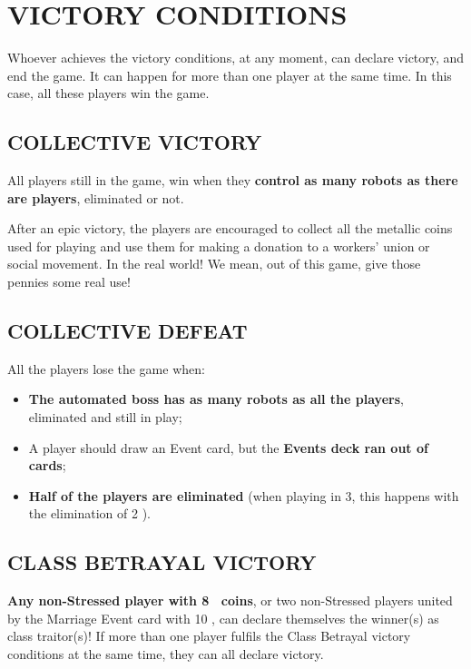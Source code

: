 \section{VICTORY CONDITIONS}

    Whoever achieves the victory conditions, at any moment, can declare victory,
    and end the game. It can happen for more than one player at the same time. In
    this case, all these players win the game.

    \subsection{COLLECTIVE VICTORY}
    
        All players still in the game, win when they \textbf{control as many robots as there are
        players}, eliminated or not.

        After an epic victory, the players are encouraged to collect all the metallic coins
        used for playing and use them for making a donation to a workers' union or social
        movement. In the real world! We mean, out of this game, give those pennies
        some real use!
    
    \subsection{COLLECTIVE DEFEAT}
    
        All the players lose the game when:
        \begin{itemize}
            \item \textbf{The automated boss has as many robots as all the players}, eliminated
            and still in play;
            \item A player should draw an Event card, but the \textbf{Events deck ran out of cards};
            \item \textbf{Half of the players are eliminated} (when playing in 3, this happens with the
            elimination of 2 \faPeopleGroup).
        \end{itemize}
    
    \subsection{CLASS BETRAYAL VICTORY}
    
        \textbf{Any non-Stressed player with 8 \faRubleSign\ coins}, or two non-Stressed players united by
        the Marriage Event card with 10 \faRubleSign, can declare themselves the winner(s) as class
        traitor(s)!
        If more than one player fulfils the Class Betrayal victory conditions at the same
        time, they can all declare victory.



